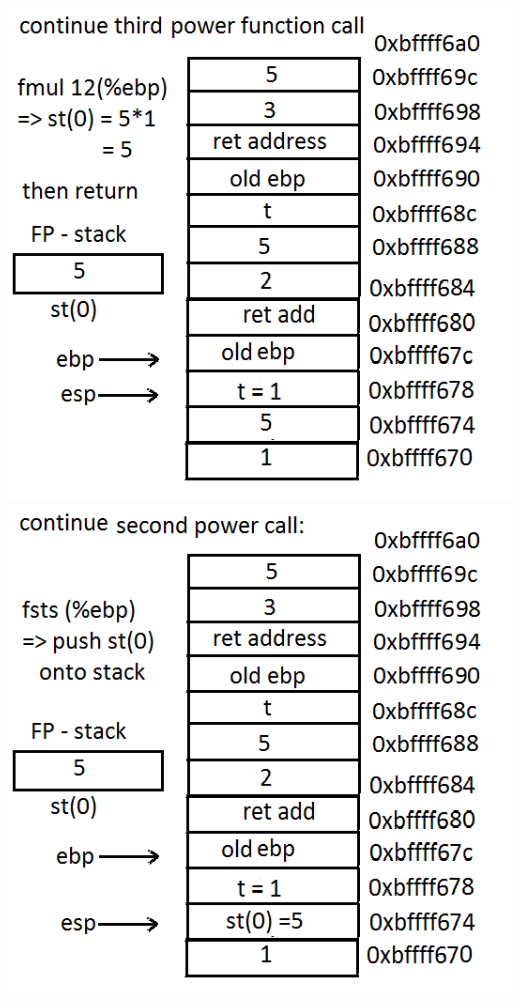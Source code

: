 \documentclass{article}
\begin{document}
\includegraphics[scale=0.5]{stack14.png}\\
\includegraphics[scale=0.5]{stack15.png}
\end{document}
